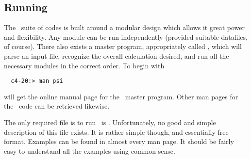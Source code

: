 \subsection{Running \PSIthree}
The \PSIthree\ suite of codes is built around a modular design which 
allows it great power and flexibility. Any module can be run 
independently (provided suitable datafiles, of course). There also exists a
master program, appropriately called \PSIdriver, which will parse 
an input file, recognize the overall calculation desired, 
and run all the necessary modules in the correct order. To begin with 
\begin{verbatim}
  c4-20:> man psi
\end{verbatim}
will get the online manual page for the \PSIdriver\ master program.
Other man pages for the \PSIdriver\ code can be retrieved likewise.

The only required file is to run \PSIthree\ is . 
Unfortunately, no good and simple description of this
file exists. It is rather simple though, and essentially
free format. Examples can be found in
almost every man page. It should be fairly easy to
understand all the examples using common sense. 

